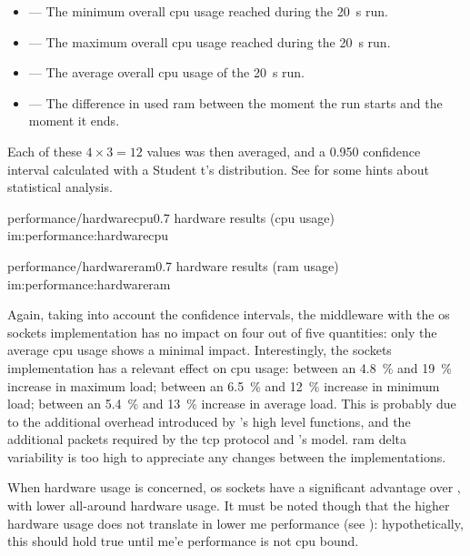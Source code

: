 \begin{itemize}
	\item {} --- The minimum overall \gls{cpu} usage reached during the \SI{20}{\second} run.
	\item {} --- The maximum overall \gls{cpu} usage reached during the \SI{20}{\second} run.
	\item {} --- The average overall \gls{cpu} usage of the \SI{20}{\second} run.
	\item {} --- The difference in used \gls{ram} between the moment the run starts and the moment it ends.
\end{itemize}

\FLOATnoindent Each of these $4\times3=12$ values was then averaged, and a \num{0,950} confidence interval calculated with a Student t's distribution. See  for some hints about statistical analysis.

\begin{image}
	{performance/hardwarecpu}{0.7}
	{hardware results (\gls{cpu} usage)}
	{im:performance:hardwarecpu}
	{}
\end{image}

\begin{image}
	{performance/hardwareram}{0.7}
	{hardware results (\gls{ram} usage)}
	{im:performance:hardwareram}
	{}
\end{image}

Again, taking into account the confidence intervals, the \gls{middleware} with the \gls{os} sockets implementation has no impact on four out of five quantities: only the average \gls{cpu} usage shows a minimal impact. Interestingly, the  sockets implementation has a relevant effect on \gls{cpu} usage: between an \SI{4,8}{\percent} and \SI{19}{\percent} increase in maximum load; between an \SI{6,5}{\percent} and \SI{12}{\percent} increase in minimum load; between an \SI{5,4}{\percent} and \SI{13}{\percent} increase in average load. This is probably due to the additional overhead introduced by 's high level functions, and the additional packets required by the \gls{tcp} protocol and 's  model. \gls{ram} delta variability is too high to appreciate any changes between the implementations.

When hardware usage is concerned, \gls{os} sockets have a significant advantage over , with lower all-around hardware usage. It must be noted though that the higher hardware usage does not translate in lower \gls{me} performance (see ): hypothetically, this should hold true until \gls{me}'e performance is not \gls{cpu} bound.

